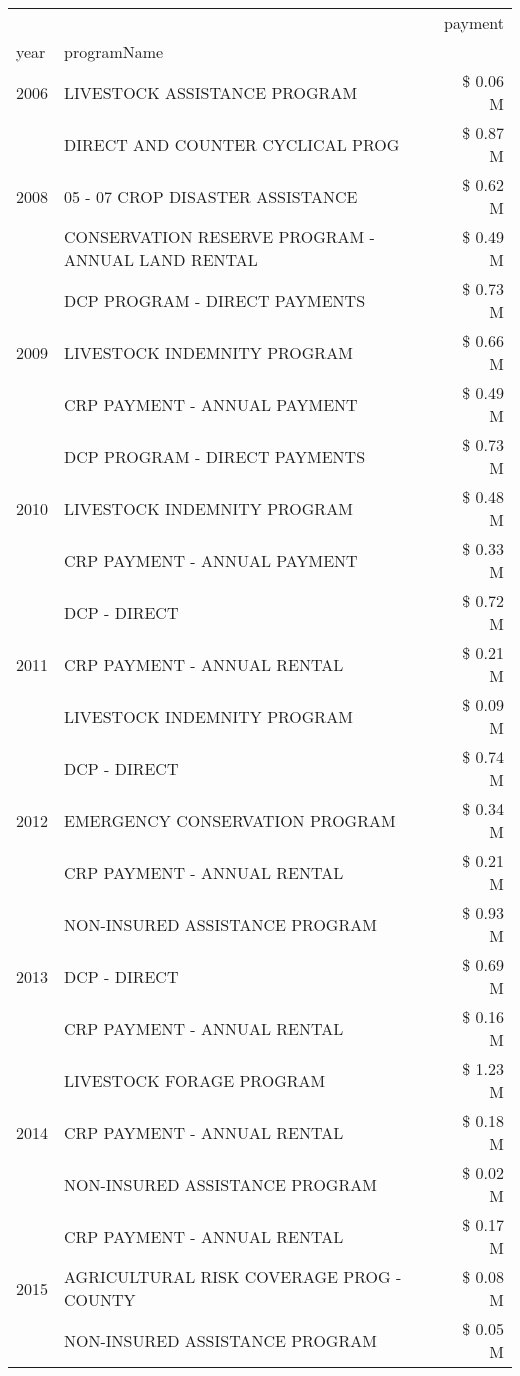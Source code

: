 \begin{tabular}{llr}
\toprule
 &  & payment \\
year & programName &  \\
\midrule
2006 & LIVESTOCK ASSISTANCE PROGRAM & \$ 0.06 M \\
\cline{1-3}
\multirow[t]{3}{*}{2008} & DIRECT AND COUNTER CYCLICAL PROG & \$ 0.87 M \\
 & 05 - 07 CROP DISASTER ASSISTANCE & \$ 0.62 M \\
 & CONSERVATION RESERVE PROGRAM - ANNUAL LAND RENTAL & \$ 0.49 M \\
\cline{1-3}
\multirow[t]{3}{*}{2009} & DCP PROGRAM - DIRECT PAYMENTS & \$ 0.73 M \\
 & LIVESTOCK INDEMNITY PROGRAM & \$ 0.66 M \\
 & CRP PAYMENT - ANNUAL PAYMENT & \$ 0.49 M \\
\cline{1-3}
\multirow[t]{3}{*}{2010} & DCP PROGRAM - DIRECT PAYMENTS & \$ 0.73 M \\
 & LIVESTOCK INDEMNITY PROGRAM & \$ 0.48 M \\
 & CRP PAYMENT - ANNUAL PAYMENT & \$ 0.33 M \\
\cline{1-3}
\multirow[t]{3}{*}{2011} & DCP - DIRECT & \$ 0.72 M \\
 & CRP PAYMENT - ANNUAL RENTAL & \$ 0.21 M \\
 & LIVESTOCK INDEMNITY PROGRAM & \$ 0.09 M \\
\cline{1-3}
\multirow[t]{3}{*}{2012} & DCP - DIRECT & \$ 0.74 M \\
 & EMERGENCY CONSERVATION PROGRAM & \$ 0.34 M \\
 & CRP PAYMENT - ANNUAL RENTAL & \$ 0.21 M \\
\cline{1-3}
\multirow[t]{3}{*}{2013} & NON-INSURED ASSISTANCE PROGRAM & \$ 0.93 M \\
 & DCP - DIRECT & \$ 0.69 M \\
 & CRP PAYMENT - ANNUAL RENTAL & \$ 0.16 M \\
\cline{1-3}
\multirow[t]{3}{*}{2014} & LIVESTOCK FORAGE PROGRAM & \$ 1.23 M \\
 & CRP PAYMENT - ANNUAL RENTAL & \$ 0.18 M \\
 & NON-INSURED ASSISTANCE PROGRAM & \$ 0.02 M \\
\cline{1-3}
\multirow[t]{3}{*}{2015} & CRP PAYMENT - ANNUAL RENTAL & \$ 0.17 M \\
 & AGRICULTURAL RISK COVERAGE PROG - COUNTY & \$ 0.08 M \\
 & NON-INSURED ASSISTANCE PROGRAM & \$ 0.05 M \\

\end{tabular}
